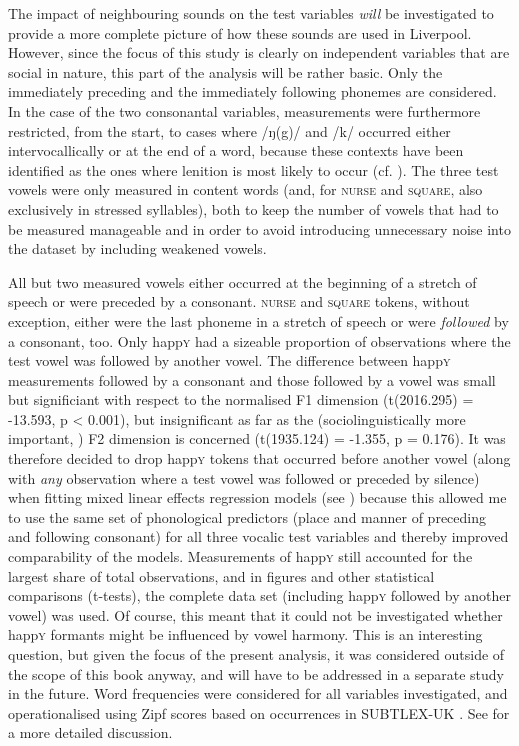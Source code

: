 The impact of neighbouring sounds on the test variables \emph{will} be investigated to provide a more complete picture of how these sounds are used in Liverpool.
However, since the focus of this study is clearly on independent variables that are social in nature, this part of the analysis will be rather basic.
Only the immediately preceding and the immediately following phonemes are considered.
In the case of the two consonantal variables, measurements were furthermore restricted, from the start, to cases where /ŋ(g)/ and /k/ occurred either intervocallically or at the end of a word, because these contexts have been identified as the ones where lenition is most likely to occur (cf. ).
The three test vowels were only measured in content words (and, for \textsc{nurse} and \textsc{square}, also exclusively in stressed syllables), both to keep the number of vowels that had to be measured manageable and in order to avoid introducing unnecessary noise into the dataset by including weakened vowels.

All but two measured vowels either occurred at the beginning of a stretch of speech or were preceded by a consonant.
\textsc{nurse} and \textsc{square} tokens, without exception, either were the last phoneme in a stretch of speech or were \emph{followed} by a consonant, too.
Only happ\textsc{y} had a sizeable proportion of observations where the test vowel was followed by another vowel.
The difference between happ\textsc{y} measurements followed by a consonant and those followed by a vowel was small but significiant with respect to the normalised F1 dimension (t(2016.295) = -13.593, p < 0.001), but insignificant as far as the (sociolinguistically more important, \citealt[cf.][502]{labov2006a}) F2 dimension is concerned (t(1935.124) = -1.355, p = 0.176).
It was therefore decided to drop happ\textsc{y} tokens that occurred before another vowel (along with \emph{any} observation where a test vowel was followed or preceded by silence) when fitting mixed linear effects regression models (see ) because this allowed me to use the same set of phonological predictors (place and manner of preceding and following consonant) for all three vocalic test variables and thereby improved comparability of the models.
Measurements of happ\textsc{y} still accounted for the largest share of total observations, and in figures and other statistical comparisons (t-tests), the complete data set (including happ\textsc{y} followed by another vowel) was used.
Of course, this meant that it could not be investigated whether happ\textsc{y} formants might be influenced by vowel harmony.
This is an interesting question, but given the focus of the present analysis, it was considered outside of the scope of this book anyway, and will have to be addressed in a separate study in the future.
Word frequencies were considered for all variables investigated, and operationalised using Zipf scores based on occurrences in SUBTLEX-UK \parencite{heuvenetal2014}.
See  for a more detailed discussion.

